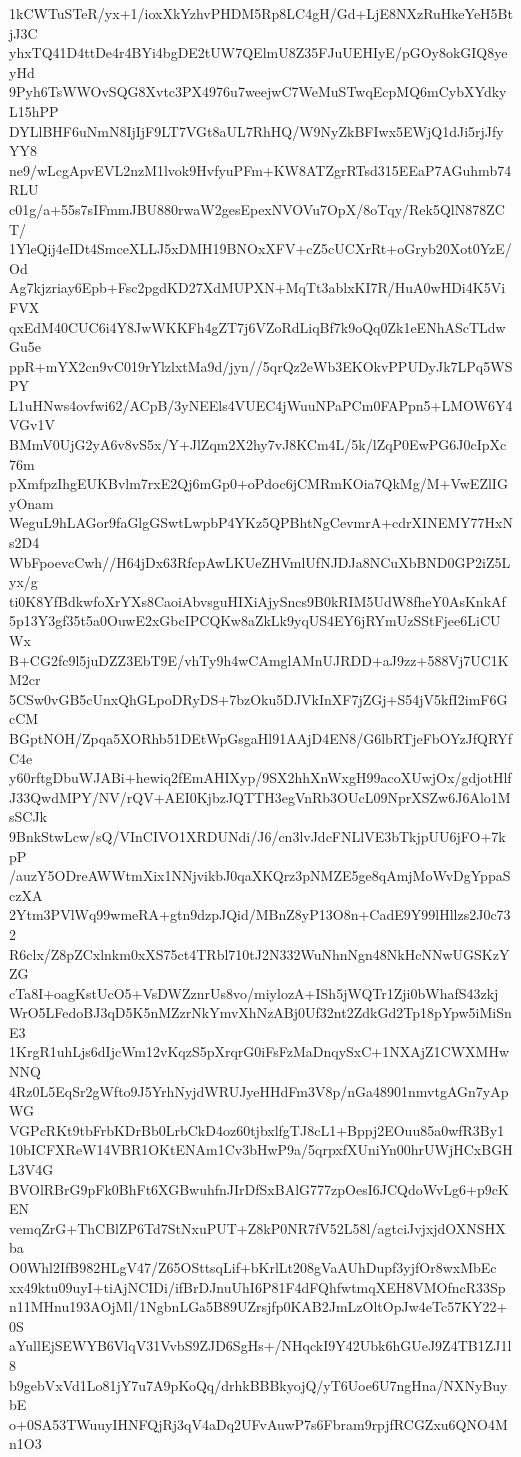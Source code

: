 1kCWTuSTeR/yx+1/ioxXkYzhvPHDM5Rp8LC4gH/Gd+LjE8NXzRuHkeYeH5BtjJ3C
yhxTQ41D4ttDe4r4BYi4bgDE2tUW7QElmU8Z35FJuUEHIyE/pGOy8okGIQ8yeyHd
9Pyh6TsWWOvSQG8Xvtc3PX4976u7weejwC7WeMuSTwqEcpMQ6mCybXYdkyL15hPP
DYLlBHF6uNmN8IjIjF9LT7VGt8aUL7RhHQ/W9NyZkBFIwx5EWjQ1dJi5rjJfyYY8
ne9/wLcgApvEVL2nzM1lvok9HvfyuPFm+KW8ATZgrRTsd315EEaP7AGuhmb74RLU
c01g/a+55s7sIFmmJBU880rwaW2gesEpexNVOVu7OpX/8oTqy/Rek5QlN878ZCT/
1YleQij4eIDt4SmceXLLJ5xDMH19BNOxXFV+cZ5cUCXrRt+oGryb20Xot0YzE/Od
Ag7kjzriay6Epb+Fsc2pgdKD27XdMUPXN+MqTt3ablxKI7R/HuA0wHDi4K5ViFVX
qxEdM40CUC6i4Y8JwWKKFh4gZT7j6VZoRdLiqBf7k9oQq0Zk1eENhAScTLdwGu5e
ppR+mYX2cn9vC019rYlzlxtMa9d/jyn//5qrQz2eWb3EKOkvPPUDyJk7LPq5WSPY
L1uHNws4ovfwi62/ACpB/3yNEEls4VUEC4jWuuNPaPCm0FAPpn5+LMOW6Y4VGv1V
BMmV0UjG2yA6v8vS5x/Y+JlZqm2X2hy7vJ8KCm4L/5k/lZqP0EwPG6J0cIpXc76m
pXmfpzIhgEUKBvlm7rxE2Qj6mGp0+oPdoc6jCMRmKOia7QkMg/M+VwEZlIGyOnam
WeguL9hLAGor9faGlgGSwtLwpbP4YKz5QPBhtNgCevmrA+cdrXINEMY77HxNs2D4
WbFpoevcCwh//H64jDx63RfcpAwLKUeZHVmlUfNJDJa8NCuXbBND0GP2iZ5Lyx/g
ti0K8YfBdkwfoXrYXs8CaoiAbvsguHIXiAjySncs9B0kRIM5UdW8fheY0AsKnkAf
5p13Y3gf35t5a0OuwE2xGbcIPCQKw8aZkLk9yqUS4EY6jRYmUzSStFjee6LiCUWx
B+CG2fc9l5juDZZ3EbT9E/vhTy9h4wCAmglAMnUJRDD+aJ9zz+588Vj7UC1KM2cr
5CSw0vGB5cUnxQhGLpoDRyDS+7bzOku5DJVkInXF7jZGj+S54jV5kfI2imF6GcCM
BGptNOH/Zpqa5XORhb51DEtWpGsgaHl91AAjD4EN8/G6lbRTjeFbOYzJfQRYfC4e
y60rftgDbuWJABi+hewiq2fEmAHIXyp/9SX2hhXnWxgH99acoXUwjOx/gdjotHlf
J33QwdMPY/NV/rQV+AEI0KjbzJQTTH3egVnRb3OUcL09NprXSZw6J6Alo1MsSCJk
9BnkStwLcw/sQ/VInCIVO1XRDUNdi/J6/cn3lvJdcFNLlVE3bTkjpUU6jFO+7kpP
/auzY5ODreAWWtmXix1NNjvikbJ0qaXKQrz3pNMZE5ge8qAmjMoWvDgYppaSczXA
2Ytm3PVlWq99wmeRA+gtn9dzpJQid/MBnZ8yP13O8n+CadE9Y99lHllzs2J0c732
R6clx/Z8pZCxlnkm0xXS75ct4TRbl710tJ2N332WuNhnNgn48NkHcNNwUGSKzYZG
cTa8I+oagKstUcO5+VsDWZznrUs8vo/miylozA+ISh5jWQTr1Zji0bWhafS43zkj
WrO5LFedoBJ3qD5K5nMZzrNkYmvXhNzABj0Uf32nt2ZdkGd2Tp18pYpw5iMiSnE3
1KrgR1uhLjs6dIjcWm12vKqzS5pXrqrG0iFsFzMaDnqySxC+1NXAjZ1CWXMHwNNQ
4Rz0L5EqSr2gWfto9J5YrhNyjdWRUJyeHHdFm3V8p/nGa48901nmvtgAGn7yApWG
VGPcRKt9tbFrbKDrBb0LrbCkD4oz60tjbxlfgTJ8cL1+Bppj2EOuu85a0wfR3By1
10bICFXReW14VBR1OKtENAm1Cv3bHwP9a/5qrpxfXUniYn00hrUWjHCxBGHL3V4G
BVOlRBrG9pFk0BhFt6XGBwuhfnJIrDfSxBAlG777zpOesI6JCQdoWvLg6+p9cKEN
vemqZrG+ThCBlZP6Td7StNxuPUT+Z8kP0NR7fV52L58l/agtciJvjxjdOXNSHXba
O0Whl2IfB982HLgV47/Z65OSttsqLif+bKrlLt208gVaAUhDupf3yjfOr8wxMbEc
xx49ktu09uyI+tiAjNCIDi/ifBrDJnuUhI6P81F4dFQhfwtmqXEH8VMOfncR33Sp
n11MHnu193AOjMl/1NgbnLGa5B89UZrsjfp0KAB2JmLzOltOpJw4eTc57KY22+0S
aYullEjSEWYB6VlqV31VvbS9ZJD6SgHs+/NHqckI9Y42Ubk6hGUeJ9Z4TB1ZJ1l8
b9gebVxVd1Lo81jY7u7A9pKoQq/drhkBBBkyojQ/yT6Uoe6U7ngHna/NXNyBuybE
o+0SA53TWuuyIHNFQjRj3qV4aDq2UFvAuwP7s6Fbram9rpjfRCGZxu6QNO4Mn1O3
